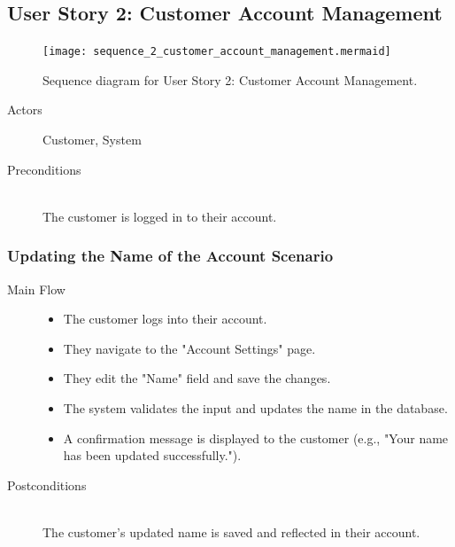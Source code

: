 \documentclass[twoside,a4paper,journal]{IEEEtran}
\begin{document}
\subsection{User Story 2: Customer Account Management}
\begin{figure}[!t]
\centering
\texttt{[image: sequence\_2\_customer\_account\_management.mermaid]}
\caption{Sequence diagram for User Story 2: Customer Account Management.}
\label{fig:sequence_2}
\end{figure}
\begin{description}
  \item[Actors] Customer, System
  \item[Preconditions] \hfill \\
    The customer is logged in to their account.
\end{description}
\subsubsection{Updating the Name of the Account Scenario}
\begin{description}
  \item[Main Flow] \hfill
  \begin{itemize}
    \item The customer logs into their account.
    \item They navigate to the "Account Settings" page.
    \item They edit the "Name" field and save the changes.
    \item The system validates the input and updates the name in the database.
    \item A confirmation message is displayed to the customer
      (e.g., "Your name has been updated successfully.").
  \end{itemize}
  \item[Postconditions] \hfill \\
    The customer's updated name is saved and reflected in their account.
\end{description}
\end{document}
